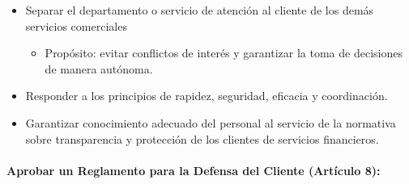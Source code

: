 \documentclass[
]{article}
\providecommand{\tightlist}{%
  \setlength{\itemsep}{0pt}\setlength{\parskip}{0pt}}
\begin{document}
\begin{itemize}
\tightlist
\item
  Separar el departamento o servicio de atención al cliente de los demás
  servicios comerciales

  \begin{itemize}
  \tightlist
  \item
    Propósito: evitar conflictos de interés y garantizar la toma de
    decisiones de manera autónoma.
  \end{itemize}
\item
  Responder a los principios de rapidez, seguridad, eficacia y
  coordinación.
\item
  Garantizar conocimiento adecuado del personal al servicio de la
  normativa sobre transparencia y protección de los clientes de
  servicios financieros.
\end{itemize}

\hypertarget{aprobar-un-reglamento-para-la-defensa-del-cliente-artuxedculo-8}{%
\paragraph{\texorpdfstring{Aprobar un Reglamento para la Defensa del
Cliente (\textbf{Artículo
8}):}{Aprobar un Reglamento para la Defensa del Cliente (Artículo 8):}}\label{aprobar-un-reglamento-para-la-defensa-del-cliente-artuxedculo-8}}
\end{document}
